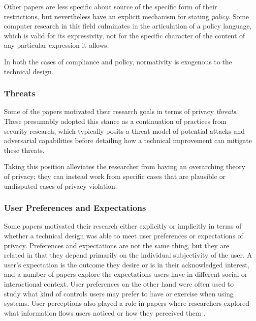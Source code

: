 \documentclass[../thesis.tex]{subfiles}
\begin{document}
Other papers are less specific about source of the specific form of
their restrictions, but nevertheless have an explicit mechanism for
stating \textit{policy}. Some computer research in this field
culminates in the articulation of a policy language, which is valid for
its expressivity, not for the specific character of the content of any
particular expression it allows.

In both the cases of compliance and policy, normativity is exogenous to
the technical design. 

\subsubsection{Threats}
\label{CI4.3.2}

Some of the papers motivated their research goals in terms of privacy
\textit{threats}. These presumably adopted this stance as a
continuation of practices from security research, which typically
posits a threat model of potential attacks and adversarial capabilities
before detailing how a technical improvement can mitigate these
threats.

Taking this position alleviates the researcher from having an
overarching theory of privacy; they can instead work from specific
cases that are plausible or undisputed cases of privacy violation.

\subsubsection{User Preferences and Expectations}
\label{CI4.3.3}

\bigskip

Some papers motivated their research either explicitly or implicitly in
terms of whether a technical design was able to meet user preferences
or expectations of privacy. Preferences and expectations are not the
same thing, but they are related in that they depend primarily on the
individual subjectivity of the user. A user's
expectation is the outcome they desire or is in their acknowledged
interest, and a number of papers explore the expectations users have in
different social or interactional context. User preferences on the
other hand were often used to study what kind of controls users may
prefer to have or exercise when using systems. User perceptions also
played a role in papers where researchers explored what information
flows users noticed or how they perceived them
\cite{wijesekera2015android} \cite{zhang2013no}.
\end{document}
